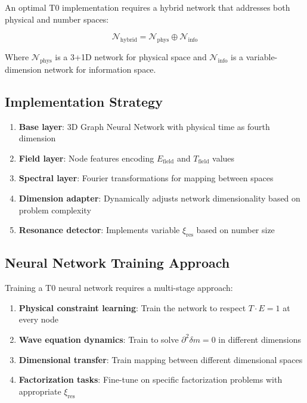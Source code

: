 \documentclass[12pt,a4paper]{article}
\newcommand{\xipar}{\ensuremath{\xi}}
\newcommand{\deltafield}{\ensuremath{\delta m}}
\begin{document}
	An optimal T0 implementation requires a hybrid network that addresses both physical and number spaces:
	
	\begin{equation}
		\mathcal{N}_{\text{hybrid}} = \mathcal{N}_{\text{phys}} \oplus \mathcal{N}_{\text{info}}
	\end{equation}
	
	Where $\mathcal{N}_{\text{phys}}$ is a 3+1D network for physical space and $\mathcal{N}_{\text{info}}$ is a variable-dimension network for information space.
	
	\subsection{Implementation Strategy}
	\label{subsec:implementation_strategy}
	
	\begin{tcolorbox}[colback=blue!5!white,colframe=blue!75!black,title=Optimal T0 Network Implementation Strategy]
		\begin{enumerate}
			\item \textbf{Base layer}: 3D Graph Neural Network with physical time as fourth dimension
			\item \textbf{Field layer}: Node features encoding $E_{\text{field}}$ and $T_{\text{field}}$ values
			\item \textbf{Spectral layer}: Fourier transformations for mapping between spaces
			\item \textbf{Dimension adapter}: Dynamically adjusts network dimensionality based on problem complexity
			\item \textbf{Resonance detector}: Implements variable $\xipar_{\text{res}}$ based on number size
		\end{enumerate}
	\end{tcolorbox}
	
	\subsection{Neural Network Training Approach}
	\label{subsec:training_approach}
	
	Training a T0 neural network requires a multi-stage approach:
	
	\begin{enumerate}
		\item \textbf{Physical constraint learning}: Train the network to respect $T \cdot E = 1$ at every node
		\item \textbf{Wave equation dynamics}: Train to solve $\partial^2 \deltafield = 0$ in different dimensions
		\item \textbf{Dimensional transfer}: Train mapping between different dimensional spaces
		\item \textbf{Factorization tasks}: Fine-tune on specific factorization problems with appropriate $\xipar_{\text{res}}$
	\end{enumerate}
	
\end{document}
